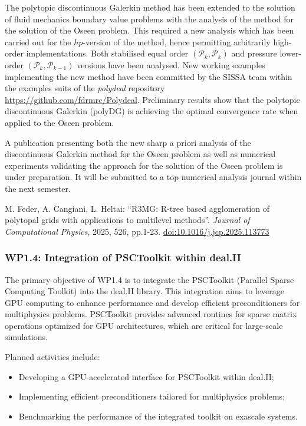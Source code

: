 \documentclass[a4paper,12pt, numbers]{article}
\begin{document}
The polytopic discontinuous Galerkin method has been extended to the solution of fluid mechanics boundary value problems with the analysis of the method for the solution of the Oseen problem. This required a new analysis which has been carried out for the $hp$-version of the method, hence permitting arbitrarily high-order implementations. Both stabilised equal order $(\mathcal{P}_k,\mathcal{P}_{k})$ and pressure lower-order $(\mathcal{P}_k,\mathcal{P}_{k-1})$ versions have been analysed. 
New working examples implementing the new method have been committed by the SISSA team within the examples suits of the {\em polydeal} repository \url{https://github.com/fdrmrc/Polydeal}. Preliminary results show that the polytopic discontinuous Galerkin (polyDG) is achieving the optimal convergence rate when applied to the Oseen problem. 

A publication presenting both the new sharp a priori analysis of the discontinuous Galerkin method for the Oseen problem as well as numerical experiments validating the approach for the solution of the Oseen problem is under preparation. It will be submitted to a top numerical analysis journal within the next semester.

\begin{thebibliography}{10}
 M. Feder, A. Cangiani, L. Heltai: ``R3MG: R-tree based agglomeration of polytopal grids with applications to multilevel methods''. \emph{Journal of Computational Physics}, 2025, 526,
pp.1-23. \href{https://doi.org/10.1016/j.jcp.2025.113773}{doi:10.1016/j.jcp.2025.113773}
\end{thebibliography}


\subsubsection*{WP1.4: Integration of PSCToolkit within deal.II} %

The primary objective of WP1.4 is to integrate the PSCToolkit (Parallel Sparse Computing Toolkit) into the deal.II library. This integration aims to leverage GPU computing to enhance performance and develop efficient preconditioners for multiphysics problems. PSCToolkit provides advanced routines for sparse matrix operations optimized for GPU architectures, which are critical for large-scale simulations.

Planned activities include:
\begin{itemize}
\item Developing a GPU-accelerated interface for PSCToolkit within deal.II;
\item Implementing efficient preconditioners tailored for multiphysics problems;
\item Benchmarking the performance of the integrated toolkit on exascale systems.
\end{itemize}
\end{document}
